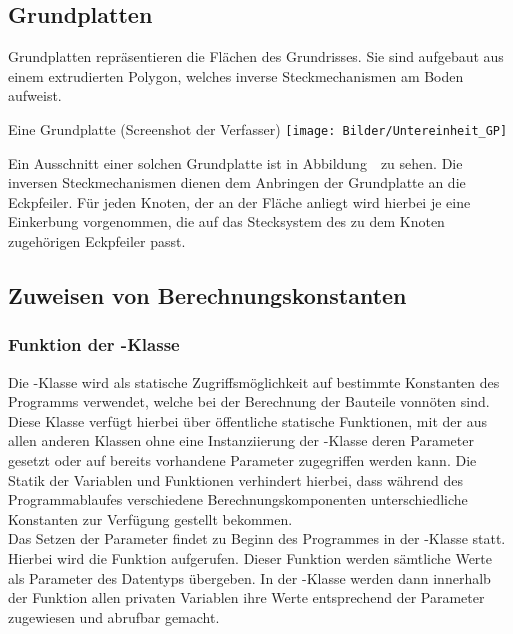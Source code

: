 \subsection{Grundplatten}
Grundplatten repräsentieren die Flächen des Grundrisses.
Sie sind aufgebaut aus einem extrudierten Polygon, welches inverse Steckmechanismen am Boden aufweist.
\begin{Bild}{Eine Grundplatte (Screenshot der Verfasser)}
	\texttt{[image: Bilder/Untereinheit\_GP]}
\end{Bild}
Ein Ausschnitt einer solchen Grundplatte ist in Abbildung~\thebildnr\ zu sehen.
Die inversen Steckmechanismen dienen dem Anbringen der Grundplatte an die Eckpfeiler.
Für jeden Knoten, der an der Fläche anliegt wird hierbei je eine Einkerbung vorgenommen, die auf das Stecksystem des zu dem Knoten zugehörigen Eckpfeiler passt.

\subsection{Zuweisen von Berechnungskonstanten}
\subsubsection{Funktion der -Klasse}
Die -Klasse wird als statische Zugriffsmöglichkeit auf bestimmte Konstanten des Programms verwendet, welche bei der Berechnung der Bauteile vonnöten sind.
Diese Klasse verfügt hierbei über öffentliche statische Funktionen, mit der aus allen anderen Klassen ohne eine Instanziierung der -Klasse deren Parameter gesetzt oder auf bereits vorhandene Parameter zugegriffen werden kann.
Die Statik der Variablen und Funktionen verhindert hierbei, dass während des Programmablaufes verschiedene  Berechnungskomponenten unterschiedliche Konstanten zur Verfügung gestellt bekommen. \\
Das Setzen der Parameter findet zu Beginn des Programmes in der -Klasse statt.
Hierbei wird die Funktion  aufgerufen.
Dieser Funktion werden sämtliche Werte als Parameter des Datentyps  übergeben.
In der -Klasse werden dann innerhalb der Funktion allen privaten Variablen ihre Werte entsprechend der Parameter zugewiesen und abrufbar gemacht.\\

